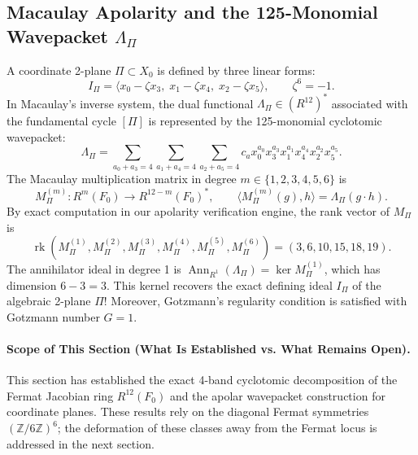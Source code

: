 \documentclass[11pt,a4paper]{article}
\theoremstyle{definition}
\theoremstyle{remark}
\DeclareMathOperator{\rk}{rk}
\DeclareMathOperator{\Ann}{Ann}
\begin{document}
\subsection{Macaulay Apolarity and the 125-Monomial Wavepacket $\Lambda_\Pi$}
A coordinate 2-plane $\Pi \subset X_0$ is defined by three linear forms:
\begin{equation}
I_\Pi = \langle x_0 - \zeta x_3, \; x_1 - \zeta x_4, \; x_2 - \zeta x_5 \rangle, \qquad \zeta^6 = -1.
\end{equation}
In Macaulay's inverse system, the dual functional $\Lambda_\Pi \in (R^{12})^*$ associated with the fundamental cycle $[\Pi]$ is represented by the 125-monomial cyclotomic wavepacket:
\begin{equation}
\Lambda_\Pi = \sum_{a_0+a_3=4} \sum_{a_1+a_4=4} \sum_{a_2+a_5=4} c_a x_0^{a_0} x_3^{a_3} x_1^{a_1} x_4^{a_4} x_2^{a_2} x_5^{a_5}.
\end{equation}
The Macaulay multiplication matrix in degree $m \in \{1,2,3,4,5,6\}$ is
\begin{equation}
M_\Pi^{(m)} : R^m(F_0) \longrightarrow R^{12-m}(F_0)^*, \qquad \langle M_\Pi^{(m)}(g), h \rangle = \Lambda_\Pi(g \cdot h).
\end{equation}
By exact computation in our apolarity verification engine, the rank vector of $M_\Pi$ is
\begin{equation}
\rk \left( M_\Pi^{(1)}, M_\Pi^{(2)}, M_\Pi^{(3)}, M_\Pi^{(4)}, M_\Pi^{(5)}, M_\Pi^{(6)} \right) = (3, 6, 10, 15, 18, 19).
\end{equation}
The annihilator ideal in degree 1 is $\Ann_{R^1}(\Lambda_\Pi) = \ker M_\Pi^{(1)}$, which has dimension $6 - 3 = 3$. This kernel recovers the exact defining ideal $I_\Pi$ of the algebraic 2-plane $\Pi$! Moreover, Gotzmann's regularity condition \cite{Gotzmann1978} is satisfied with Gotzmann number $G = 1$.

\paragraph{Scope of This Section (What Is Established vs. What Remains Open).}
This section has established the exact 4-band cyclotomic decomposition of the Fermat Jacobian ring $R^{12}(F_0)$ and the apolar wavepacket construction for coordinate planes. These results rely on the diagonal Fermat symmetries $(\mathbb{Z}/6\mathbb{Z})^6$; the deformation of these classes away from the Fermat locus is addressed in the next section.

\end{document}
